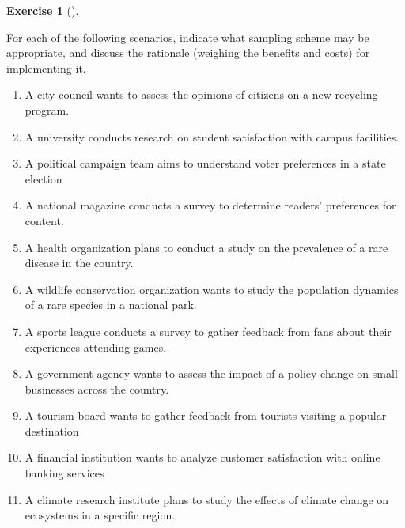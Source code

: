 \documentclass[
  letterpaper,
  DIV=11,
  numbers=noendperiod]{scrreprt}
\providecommand{\tightlist}{%
  \setlength{\itemsep}{0pt}\setlength{\parskip}{0pt}}\usepackage{longtable,booktabs,array}
\theoremstyle{definition}
\newtheorem{exercise}{Exercise}[chapter]
\theoremstyle{definition}
\theoremstyle{definition}
\theoremstyle{remark}
\begin{document}
\begin{exercise}[]\protect\hypertarget{exr-10.7}{}\label{exr-10.7}

For each of the following scenarios, indicate what sampling scheme may
be appropriate, and discuss the rationale (weighing the benefits and
costs) for implementing it.

\begin{enumerate}
\def\labelenumi{\alph{enumi}.}
\tightlist
\item
  A city council wants to assess the opinions of citizens on a new
  recycling program.
\item
  A university conducts research on student satisfaction with campus
  facilities.
\item
  A political campaign team aims to understand voter preferences in a
  state election
\item
  A national magazine conducts a survey to determine readers'
  preferences for content.
\item
  A health organization plans to conduct a study on the prevalence of a
  rare disease in the country.
\item
  A wildlife conservation organization wants to study the population
  dynamics of a rare species in a national park.
\item
  A sports league conducts a survey to gather feedback from fans about
  their experiences attending games.
\item
  A government agency wants to assess the impact of a policy change on
  small businesses across the country.
\item
  A tourism board wants to gather feedback from tourists visiting a
  popular destination
\item
  A financial institution wants to analyze customer satisfaction with
  online banking services
\item
  A climate research institute plans to study the effects of climate
  change on ecosystems in a specific region.
\end{enumerate}

\end{exercise}
\end{document}
